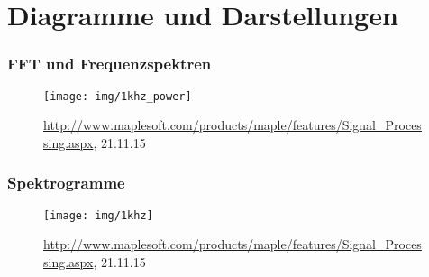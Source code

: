 \section{Diagramme und Darstellungen}

\begin{frame}
  \frametitle{FFT und Frequenzspektren}
  \begin{figure}
    \centering
    \texttt{[image: img/1khz\_power]}
    \caption{\url{ http://www.maplesoft.com/products/maple/features/Signal_Processing.aspx},  21.11.15}
  \end{figure}
\end{frame}

\begin{frame}
  \frametitle{Spektrogramme}
  \begin{figure}
    \centering
    \texttt{[image: img/1khz]}
    \caption{\url{ http://www.maplesoft.com/products/maple/features/Signal_Processing.aspx}, 21.11.15}
  \end{figure}
\end{frame}
